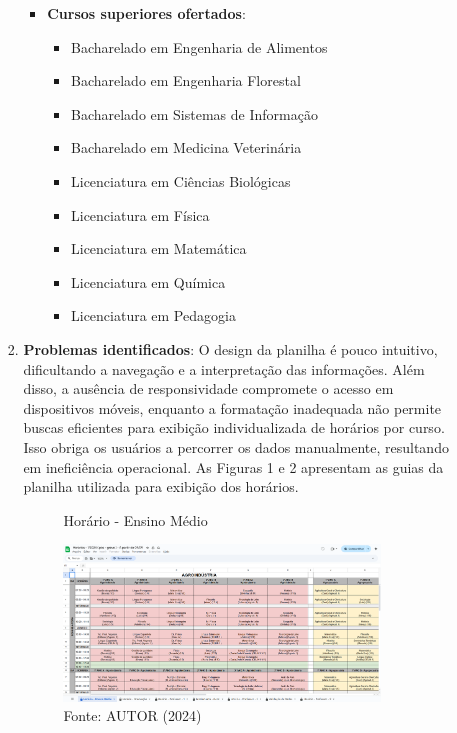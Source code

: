 \begin{itemize}
\begin{itemize}
\begin{enumerate}
\begin{itemize}
                \item \textbf{Cursos superiores ofertados}:
                \begin{itemize}
                    \item Bacharelado em Engenharia de Alimentos
                    \item Bacharelado em Engenharia Florestal
                    \item Bacharelado em Sistemas de Informação
                    \item Bacharelado em Medicina Veterinária
                    \item Licenciatura em Ciências Biológicas
                    \item Licenciatura em Física
                    \item Licenciatura em Matemática
                    \item Licenciatura em Química
                    \item Licenciatura em Pedagogia
                \end{itemize}
            \end{itemize}
            \item \textbf{Problemas identificados}: O design da planilha é pouco intuitivo, dificultando a navegação e a interpretação das informações. Além disso, a ausência de responsividade compromete o acesso em dispositivos móveis, enquanto a formatação inadequada não permite buscas eficientes para exibição individualizada de horários por curso. Isso obriga os usuários a percorrer os dados manualmente, resultando em ineficiência operacional. As Figuras 1 e 2 apresentam as guias da planilha utilizada para exibição dos horários.

            \begin{figure}[htb]
                \centering
                \caption{Horário - Ensino Médio}
                \includegraphics[width=0.9\textwidth]{Figuras/plan-ant-1.png}
                \caption*{Fonte: AUTOR (2024)}
                \label{fig_plan-ant_1}
            \end{figure}


\end{enumerate}
\end{itemize}
\end{itemize}
